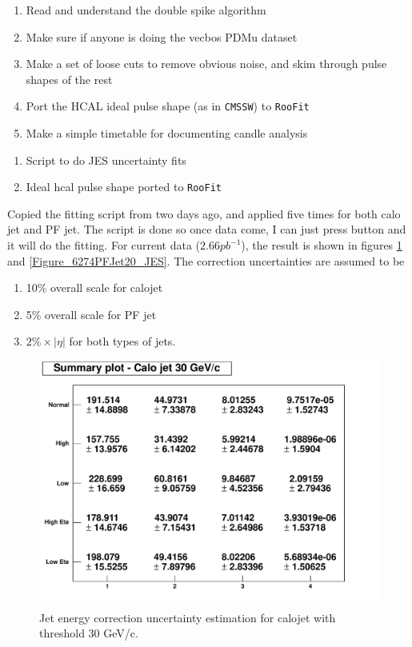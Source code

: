 

\begin{enumerate}
\item Read and understand the double spike algorithm
\item Make sure if anyone is doing the vecbos PDMu dataset
\item Make a set of loose cuts to remove obvious noise, and skim through pulse shapes of the rest
\item Port the HCAL ideal pulse shape (as in \texttt{CMSSW}) to \texttt{RooFit}
\item Make a simple timetable for documenting candle analysis
\end{enumerate}


\begin{enumerate}
\item Script to do JES uncertainty fits
\item Ideal hcal pulse shape ported to \texttt{RooFit}
\end{enumerate}


Copied the fitting script from two days ago, and applied five times for both calo jet and PF jet.
The script is done so once data come, I can just press button and it will do the fitting.
For current data ($2.66 pb^{-1}$), the result is shown in figures \ref{Figure_6274CaloJet30_JES}
and \ref{Figure_6274PFJet20_JES}.  The correction uncertainties are assumed to be

\begin{enumerate}
\item 10\% overall scale for calojet
\item 5\% overall scale for PF jet
\item $2\% \times |\eta|$ for both types of jets.
\end{enumerate}


\begin{figure}
\includegraphics[width=120mm]{DailyLog/6274/6274_CaloJet30_JES}
\caption{Jet energy correction uncertainty estimation for calojet with threshold 30 GeV/c.}
\label{Figure_6274CaloJet30_JES}
\end{figure}

